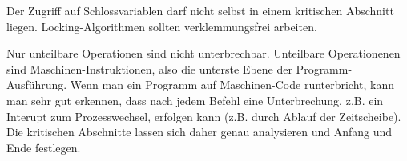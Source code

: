 \begin{answer}
Der Zugriff auf Schlossvariablen darf nicht selbst in einem kritischen Abschnitt liegen. Locking-Algorithmen sollten verklemmungsfrei arbeiten.
\end{answer}

\begin{answer}
Nur unteilbare Operationen sind nicht unterbrechbar. Unteilbare Operationenen sind Maschinen-Instruktionen, also die unterste Ebene der Programm-Ausführung.
Wenn man ein Programm auf Maschinen-Code runterbricht, kann man sehr gut erkennen, dass nach jedem Befehl eine Unterbrechung, z.B. ein Interupt zum Prozesswechsel, erfolgen kann (z.B. durch Ablauf der Zeitscheibe). Die kritischen Abschnitte lassen sich daher genau analysieren und Anfang und Ende festlegen.
\end{answer}


